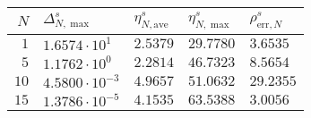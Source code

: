 \begin{table}[h]
    \begin{center}
        \begin{tabular}{r|llll}
        $N$ & $\Delta^s_{N,\max}$ & $\eta^s_{N,\text{ave}}$ & $\eta^s_{N,\max}$ & $\rho^s_{\text{err}, N}$ \\
        \hline
            $1$ & $1.6574 \cdot 10^{1}$ & $2.5379$ & $29.7780$ & $3.6535$ \\
            $5$ & $1.1762 \cdot 10^{0}$ & $2.2814$ & $46.7323$ & $8.5654$ \\
            $10$ & $4.5800 \cdot 10^{-3}$ & $4.9657$ & $51.0632$ & $29.2355$ \\
            $15$ & $1.3786 \cdot 10^{-5}$ & $4.1535$ & $63.5388$ & $3.0056$ \\

\end{tabular}
\end{center}
\end{table}
